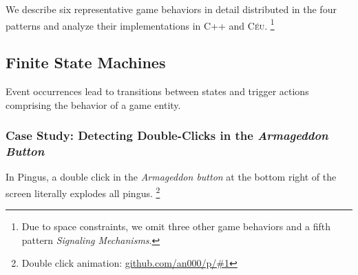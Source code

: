 \documentclass{vgtc}                          %
\newcommand{\CEU}{\textsc{C\'{e}u}\xspace}
\begin{document}
We describe six representative game behaviors in detail distributed in the four
patterns and analyze their implementations in C++ and \CEU.%
\footnote{Due to space constraints, we omit three other game behaviors and a
fifth pattern \emph{Signaling Mechanisms}.}

\subsection{Finite State Machines}
\label{sec.pats.fsms}

    Event occurrences lead to transitions between states and trigger actions
    comprising the behavior of a game entity.

\subsubsection{Case Study: Detecting Double-Clicks in the \emph{Armageddon Button}}


In Pingus, a double click in the \emph{Armageddon button} at the bottom right
of the screen literally explodes all pingus.%
\footnote{Double click animation: \url{github.com/an000/p/#1} }
\end{document}
